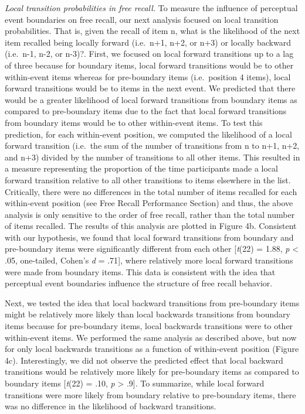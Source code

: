 \emph{Local transition probabilities in free recall.} To measure the
influence of perceptual event boundaries on free recall, our next
analysis focused on local transition probabilities. That is, given the
recall of item n, what is the likelihood of the next item recalled being
locally forward (i.e.~n+1, n+2, or n+3) or locally backward (i.e.~n-1,
n-2, or n-3)?. First, we focused on local forward transitions up to a
lag of three because for boundary items, local forward transitions would
be to other within-event items whereas for pre-boundary items
(i.e.~position 4 items), local forward transitions would be to items in
the next event. We predicted that there would be a greater likelihood of
local forward transitions from boundary items as compared to
pre-boundary items due to the fact that local forward transitions from
boundary items would be to other within-event items. To test this
prediction, for each within-event position, we computed the likelihood
of a local forward transition (i.e.~the sum of the number of transitions
from n to n+1, n+2, and n+3) divided by the number of transitions to all
other items. This resulted in a measure representing the proportion of
the time participants made a local forward transition relative to all
other transitions to items elsewhere in the list. Critically, there were
no differences in the total number of items recalled for each
within-event position (see Free Recall Performance Section) and thus,
the above analysis is only sensitive to the order of free recall, rather
than the total number of items recalled. The results of this analysis
are plotted in Figure 4b. Consistent with our hypothesis, we found that
local forward transitions from boundary and pre-boundary items were
significantly different from each other {[}\emph{t}(22) = 1.88, \emph{p}
\textless{} .05, one-tailed, Cohen's \emph{d} = .71{]}, where relatively
more local forward transitions were made from boundary items. This data
is consistent with the idea that perceptual event boundaries influence
the structure of free recall behavior.

Next, we tested the idea that local backward transitions from
pre-boundary items might be relatively more likely than local backwards
transitions from boundary items because for pre-boundary items, local
backwards transitions were to other within-event items. We performed the
same analysis as described above, but now for only local backwards
transitions as a function of within-event position (Figure 4c).
Interestingly, we did not observe the predicted effect that local
backward transitions would be relatively more likely for pre-boundary
items as compared to boundary items {[}\emph{t}(22) = .10, \emph{p}
\textgreater{} .9{]}. To summarize, while local forward transitions were
more likely from boundary relative to pre-boundary items, there was no
difference in the likelihood of backward transitions.

